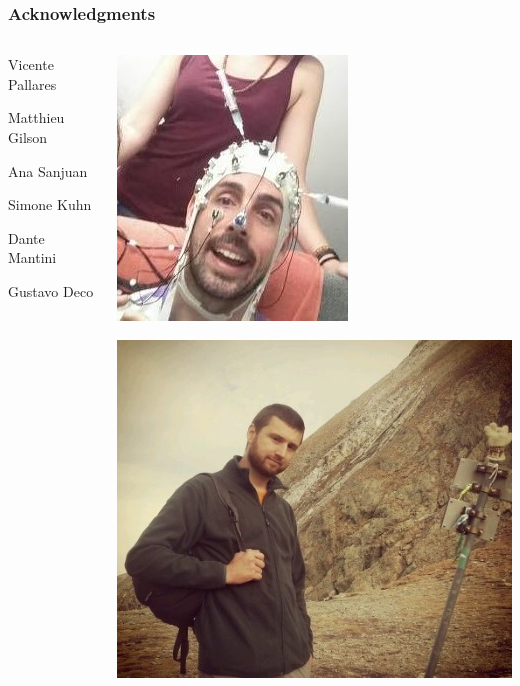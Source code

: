 \documentclass[final]{beamer}
\begin{document}
\begin{frame}
\frametitle{Acknowledgments}
\begin{columns}
\begin{column}{0.5\textwidth}
\begin{center}
	\alert<2>{Vicente Pallares}\\
\vspace{1cm}

\alert<2>{Matthieu Gilson}\\
\vspace{1cm}

\small Ana Sanjuan\\
\vspace{0.5cm}

\small Simone Kuhn\\
\vspace{0.5cm}

\small Dante Mantini\\
\vspace{0.5cm}

\small Gustavo Deco\\
\end{center}
\end{column}
\begin{column}{0.5\textwidth}
\includegraphics[width=0.5\columnwidth,valign=t]{vicente2}
\vspace{0.5cm}

\includegraphics[width=0.5\columnwidth,valign=t]{matt}
\end{column}
\end{columns}
\end{frame}
\end{document}
